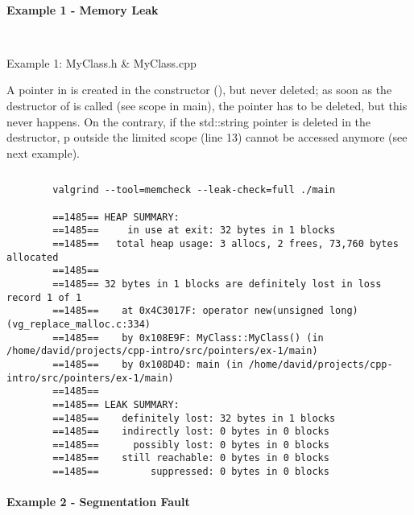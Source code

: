 \paragraph{Example 1 - Memory Leak}
	
	\begin{listing}[!htbp]
		\begin{minipage}[t]{0.45\textwidth}
			\inputminted{cpp}{src/pointers/ex-1/MyClass.h}
		\end{minipage}\hfill
		\begin{minipage}[t]{0.45\textwidth}
			\inputminted{cpp}{src/pointers/ex-1/MyClass.cpp}
		\end{minipage}
		\caption{Example 1: MyClass.h \& MyClass.cpp}
	\end{listing}

	A pointer in  is created in the constructor (), but never deleted; as soon as the destructor of  is called (see scope in main), the pointer has to be deleted, but this never happens. On the contrary, if the std::string pointer is deleted in the destructor, p outside the limited scope (line 13) cannot be accessed anymore (see next example).
	
	\inputminted{cpp}{src/pointers/ex-1/main.cpp}
	
	\begin{verbatim}
		valgrind --tool=memcheck --leak-check=full ./main
		
		==1485== HEAP SUMMARY:
		==1485==     in use at exit: 32 bytes in 1 blocks
		==1485==   total heap usage: 3 allocs, 2 frees, 73,760 bytes allocated
		==1485== 
		==1485== 32 bytes in 1 blocks are definitely lost in loss record 1 of 1
		==1485==    at 0x4C3017F: operator new(unsigned long) (vg_replace_malloc.c:334)
		==1485==    by 0x108E9F: MyClass::MyClass() (in /home/david/projects/cpp-intro/src/pointers/ex-1/main)
		==1485==    by 0x108D4D: main (in /home/david/projects/cpp-intro/src/pointers/ex-1/main)
		==1485== 
		==1485== LEAK SUMMARY:
		==1485==    definitely lost: 32 bytes in 1 blocks
		==1485==    indirectly lost: 0 bytes in 0 blocks
		==1485==      possibly lost: 0 bytes in 0 blocks
		==1485==    still reachable: 0 bytes in 0 blocks
		==1485==         suppressed: 0 bytes in 0 blocks
	\end{verbatim}
	
	\paragraph{Example 2 - Segmentation Fault}
	
